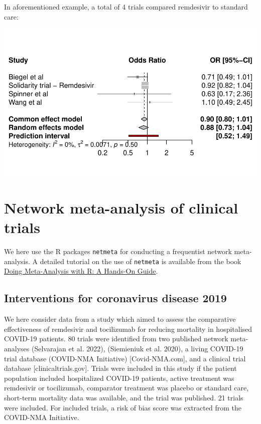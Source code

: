 \documentclass[
  letterpaper,
  DIV=11,
  numbers=noendperiod]{scrreprt}
\begin{document}
In aforementioned example, a total of 4 trials compared remdesivir to
standard care:

\includegraphics{chapter_10_files/figure-pdf/unnamed-chunk-6-1.pdf}

\hypertarget{network-meta-analysis-of-clinical-trials}{%
\section{Network meta-analysis of clinical
trials}\label{network-meta-analysis-of-clinical-trials}}

We here use the R packages \texttt{netmeta} for conducting a frequentist
network meta-analysis. A detailed tutorial on the use of
\texttt{netmeta} is available from the book
\href{https://bookdown.org/MathiasHarrer/Doing_Meta_Analysis_in_R/}{Doing
Meta-Analysis with R: A Hands-On Guide}.

\hypertarget{interventions-for-coronavirus-disease-2019}{%
\subsection{Interventions for coronavirus disease
2019}\label{interventions-for-coronavirus-disease-2019}}

We here consider data from a study which aimed to assess the comparative
effectiveness of remdesivir and tocilizumab for reducing mortality in
hospitalised COVID-19 patients. 80 trials were identified from two
published network meta-analyses (Selvarajan et al. 2022), (Siemieniuk et
al. 2020), a living COVID-19 trial database (COVID-NMA Initiative)
{[}Covid-NMA.com{]}, and a clinical trial database
{[}clinicaltrials.gov{]}. Trials were included in this study if the
patient population included hospitalized COVID-19 patients, active
treatment was remdesivir or tocilizumab, comparator treatment was
placebo or standard care, short-term mortality data was available, and
the trial was published. 21 trials were included. For included trials, a
risk of bias score was extracted from the COVID-NMA Initiative.
\end{document}

